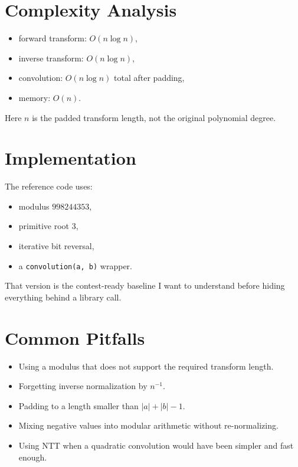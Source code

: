 \section*{Complexity Analysis}

\begin{itemize}
  \item forward transform: \(O(n \log n)\),
  \item inverse transform: \(O(n \log n)\),
  \item convolution: \(O(n \log n)\) total after padding,
  \item memory: \(O(n)\).
\end{itemize}

Here \(n\) is the padded transform length, not the original polynomial degree.

\section*{Implementation}

The reference code uses:

\begin{itemize}
  \item modulus \(998244353\),
  \item primitive root \(3\),
  \item iterative bit reversal,
  \item a \texttt{convolution(a, b)} wrapper.
\end{itemize}

That version is the contest-ready baseline I want to understand before hiding everything behind a library call.

\section*{Common Pitfalls}

\begin{itemize}
  \item Using a modulus that does not support the required transform length.
  \item Forgetting inverse normalization by \(n^{-1}\).
  \item Padding to a length smaller than \(|a| + |b| - 1\).
  \item Mixing negative values into modular arithmetic without re-normalizing.
  \item Using NTT when a quadratic convolution would have been simpler and fast enough.
\end{itemize}

